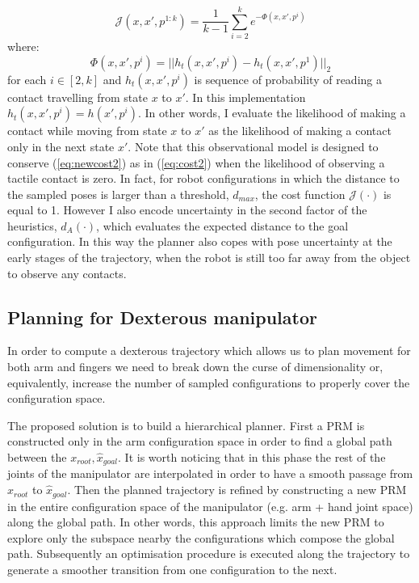 \begin{equation}\label{eq:modifiedcost}
\mathcal{J}(x,x',p^{1:k})=\frac{1}{k-1}\sum_{i=2}^k{e^{-\Phi(x,x',p^i)}}
\end{equation}
where:
$$
\Phi(x,x',p^i)=||h_t(x,x',p^i)-h_t(x,x',p^1)||_2
$$
for each $i\in[2,k]$ and $h_t(x,x',p^i)$ is sequence of probability of reading a contact travelling from state $x$ to $x'$. In this implementation $h_t(x,x',p^i)=h(x',p^i)$. In other words, I evaluate the likelihood of making a contact while moving from state $x$ to $x'$ as the likelihood of making a contact only in the next state $x'$.
Note that this observational model is designed to conserve (\ref{eq:newcost2}) as in (\ref{eq:cost2}) when the likelihood of observing a tactile contact is zero. In fact, for robot configurations in which the distance to the sampled poses is larger than a threshold, $d_{max}$, the cost function $\mathcal{J}(\cdot)$  is equal to 1. However I also encode uncertainty in the second factor of the heuristics, $d_A(\cdot)$, which evaluates the expected distance to the goal configuration. In this way the planner also copes with pose uncertainty at the early stages of the trajectory, when the robot is still too far away from the object to observe any contacts. 

\subsection{Planning for Dexterous manipulator}

In order to compute a dexterous trajectory which allows us to plan movement for both arm and fingers we need to break down the curse of dimensionality or, equivalently, increase the number of sampled configurations to properly cover the configuration space. 

The proposed solution is to build a hierarchical planner. First a PRM is constructed only in the arm configuration space in order to find a global path between the $x_{root},\hat{x}_{goal}$. It is worth noticing that in this phase the rest of the joints of the manipulator are interpolated in order to have a smooth passage from $x_{root}$ to $\hat{x}_{goal}$. Then the planned trajectory is refined by constructing a new PRM in the entire configuration space of the manipulator (e.g. arm + hand joint space) along the global path. In other words, this approach limits the new PRM to explore only the subspace nearby the configurations which compose the global path.  
Subsequently an optimisation procedure is executed along the trajectory to generate a smoother transition from one configuration to the next.

